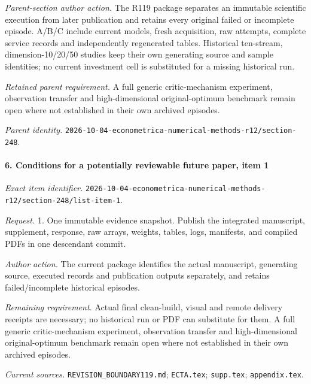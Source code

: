 \emph{Parent-section author action.} The R119 package separates an immutable scientific execution from later publication and retains every original failed or incomplete episode. A/\allowbreak{}B/\allowbreak{}C include current models, fresh acquisition, raw attempts, complete service records and independently regenerated tables. Historical ten-stream, dimension-10/20/50 studies keep their own generating source and sample identities; no current investment cell is substituted for a missing historical run.

\par\emph{Retained parent requirement.} A full generic critic-mechanism experiment, observation transfer and high-dimensional original-optimum benchmark remain open where not established in their own archived episodes.

\par\emph{Parent identity.} \nolinkurl{2026-10-04-econometrica-numerical-methods-r12/section-248}.

\paragraph{6. Conditions for a potentially reviewable future paper, item 1}

\emph{Exact item identifier.} \nolinkurl{2026-10-04-econometrica-numerical-methods-r12/section-248/list-item-1}.

\par\emph{Request.} 1. One immutable evidence snapshot. Publish the integrated manuscript, supplement, response, raw arrays, weights, tables, logs, manifests, and compiled PDFs in one descendant commit.

\par\emph{Author action.} The current package identifies the actual manuscript, generating source, executed records and publication outputs separately, and retains failed/\allowbreak{}incomplete historical episodes.

\par\emph{Remaining requirement.} Actual final clean-build, visual and remote delivery receipts are necessary; no historical run or PDF can substitute for them. A full generic critic-mechanism experiment, observation transfer and high-dimensional original-optimum benchmark remain open where not established in their own archived episodes.

\par\emph{Current sources.} \nolinkurl{REVISION_BOUNDARY119.md}; \nolinkurl{ECTA.tex}; \nolinkurl{supp.tex}; \nolinkurl{appendix.tex}.

